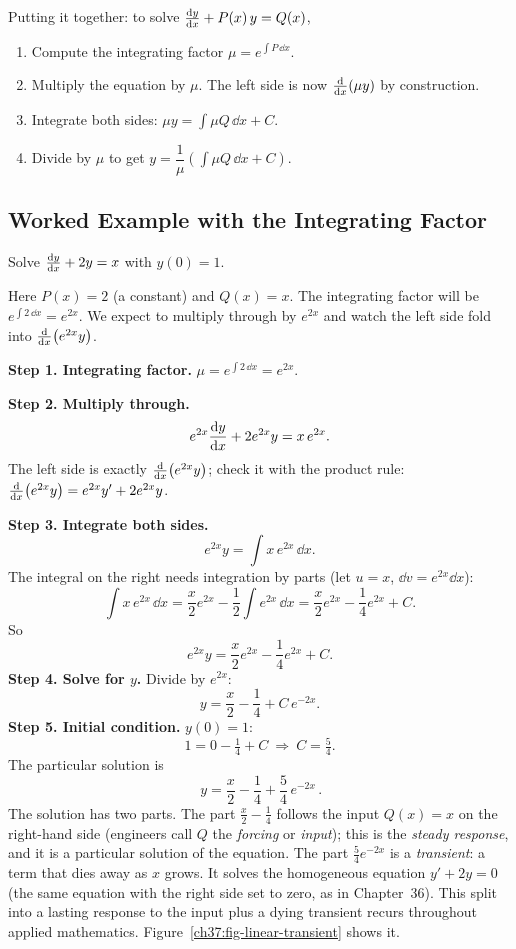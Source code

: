 Putting it together: to solve $\frac{\mathrm{d} y}{\mathrm{d} x} + P(x)\,y = Q(x)$,
\begin{enumerate}
\item Compute the integrating factor $\mu = e^{\int P\,\dd x}$.
\item Multiply the equation by $\mu$. The left side is now $\frac{\mathrm{d}}{\mathrm{d} x}\!\left(\mu y\right)$ by
construction.
\item Integrate both sides: $\mu y = \int \mu Q\,\dd x + C$.
\item Divide by $\mu$ to get $y = \dfrac{1}{\mu}\left(\int \mu Q\,\dd x + C\right)$.
\end{enumerate}

\subsection{Worked Example with the Integrating Factor}

Solve $\frac{\mathrm{d} y}{\mathrm{d} x} + 2y = x$ with $y(0)=1$.

\begin{walkbox}
Here $P(x)=2$ (a constant) and $Q(x)=x$. The integrating factor will be
$e^{\int 2\,\dd x}=e^{2x}$. We expect to multiply through by $e^{2x}$ and watch the
left side fold into $\frac{\mathrm{d}}{\mathrm{d} x}\!\left(e^{2x}y\right)$.
\end{walkbox}

\textbf{Step 1. Integrating factor.} $\mu = e^{\int 2\,\dd x}=e^{2x}$.

\textbf{Step 2. Multiply through.}
\[
  e^{2x}\frac{\mathrm{d} y}{\mathrm{d} x} + 2e^{2x}y = x\,e^{2x}.
\]
The left side is exactly $\frac{\mathrm{d}}{\mathrm{d} x}\!\left(e^{2x}y\right)$; check it with the product rule:
$\frac{\mathrm{d}}{\mathrm{d} x}\!\left(e^{2x}y\right) = e^{2x}y' + 2e^{2x}y$.

\textbf{Step 3. Integrate both sides.}
\[
  e^{2x}y = \int x\,e^{2x}\,\dd x.
\]
The integral on the right needs integration by parts (let $u=x$, $\dd v=e^{2x}\dd
x$):
\[
  \int x\,e^{2x}\,\dd x = \frac{x}{2}e^{2x} - \frac{1}{2}\int e^{2x}\,\dd x
  = \frac{x}{2}e^{2x} - \frac{1}{4}e^{2x} + C.
\]
So
\[
  e^{2x}y = \frac{x}{2}e^{2x} - \frac{1}{4}e^{2x} + C.
\]
\textbf{Step 4. Solve for $y$.} Divide by $e^{2x}$:
\[
  y = \frac{x}{2} - \frac{1}{4} + C\,e^{-2x}.
\]
\textbf{Step 5. Initial condition.} $y(0)=1$:
\[
  1 = 0 - \tfrac14 + C \ \Rightarrow\ C = \tfrac54.
\]
The particular solution is
\[
  \boxed{\,y = \frac{x}{2} - \frac14 + \frac54\,e^{-2x}\,}.
\]
The solution has two parts. The part $\frac{x}{2}-\frac14$ follows the input
$Q(x)=x$ on the right-hand side (engineers call $Q$ the \emph{forcing} or
\emph{input}); this is the \emph{steady response}, and it is a particular
solution of the equation. The part $\frac54 e^{-2x}$ is a \emph{transient}: a
term that dies away as $x$ grows. It solves the homogeneous equation
$y'+2y=0$ (the same equation with the right side set to zero, as in Chapter~36).
This split into a lasting response to the input plus a dying transient recurs
throughout applied mathematics.
Figure~\ref{ch37:fig-linear-transient} shows it.

